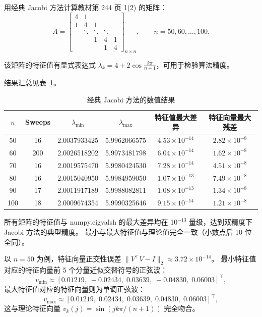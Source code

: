 \documentclass[10pt, a4paper]{article}
\begin{document}
用经典 Jacobi 方法计算教材第 244 页 1(2) 的矩阵：
\[
A = \begin{bmatrix}
4 & 1 & & & \\
1 & 4 & 1 & & \\
& \ddots & \ddots & \ddots & \\
& & 1 & 4 & 1 \\
& & & 1 & 4
\end{bmatrix}_{n\times n},
\qquad n = 50, 60, \ldots, 100.
\]

该矩阵的特征值有显式表达式 $\lambda_k = 4 + 2\cos\frac{k\pi}{n+1}$，可用于检验算法精度。

结果汇总见表~\ref{tab:jacobi_results}。

\begin{table}[H]
    \centering
    \caption{经典 Jacobi 方法的数值结果}
    \label{tab:jacobi_results}
    \begin{tabular}{cccccc}
        \toprule
        $n$ & Sweeps & $\lambda_{\min}$ & $\lambda_{\max}$ &
        特征值最大差异 & 特征向量最大残差 \\
        \midrule
        50  & 16 & 2.0037933425 & 5.9962066575 & $4.53\times10^{-14}$ & $2.82\times10^{-8}$ \\
        60  & 200 & 2.0026518202 & 5.9973481798 & $6.04\times10^{-14}$ & $1.62\times10^{-8}$ \\
        70  & 16 & 2.0019575470 & 5.9980424530 & $7.28\times10^{-14}$ & $4.51\times10^{-8}$ \\
        80  & 16 & 2.0015040950 & 5.9984959050 & $1.07\times10^{-13}$ & $7.49\times10^{-8}$ \\
        90  & 17 & 2.0011917189 & 5.9988082811 & $1.08\times10^{-13}$ & $1.34\times10^{-8}$ \\
        100 & 18 & 2.0009674354 & 5.9990325646 & $9.15\times10^{-14}$ & $1.21\times10^{-8}$ \\
        \bottomrule
    \end{tabular}
\end{table}

所有矩阵的特征值与 numpy.eigvalsh 的最大差异均在 $10^{-13}$ 量级，达到双精度下 Jacobi 方法的典型精度。
最小与最大特征值与理论值完全一致（小数点后 10 位全同）。

以 $n = 50$ 为例，特征向量正交性误差 $\|V^{\!\top} V - I\|_2 \approx 3.72\times 10^{-14}$。
最小特征值对应的特征向量前 5 个分量近似交替符号的正弦波：
\[
v_{\min} \approx [0.01219,\; -0.02434,\; 0.03639,\; -0.04830,\; 0.06003]^{\!\top},
\]
最大特征值对应的特征向量则为单调正弦波：
\[
v_{\max} \approx [0.01219,\; 0.02434,\; 0.03639,\; 0.04830,\; 0.06003]^{\!\top},
\]
这与理论特征向量 $v_k(j) = \sin(jk\pi/(n+1))$ 完全吻合。
\end{document}

